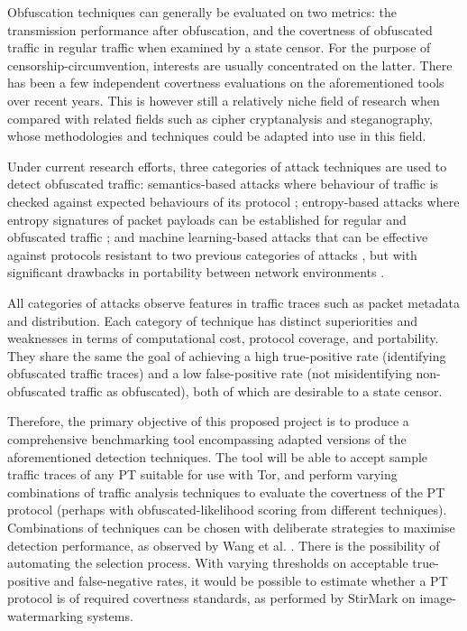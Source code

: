 \documentclass[11pt]{article}
\begin{document}
Obfuscation techniques can generally be evaluated on two metrics: the transmission performance after obfuscation, and the covertness of obfuscated traffic in regular traffic when examined by a state censor. For the purpose of censorship-circumvention, interests are usually concentrated on the latter. There has been a few independent covertness evaluations on the aforementioned tools \cite{tan2015towards} \cite{houmansadr2013parrot} \cite{wang2015seeing} over recent years. This is however still a relatively niche field of research when compared with related fields such as cipher cryptanalysis and steganography, whose methodologies and techniques could be adapted into use in this field.

Under current research efforts, three categories of attack techniques are used to detect obfuscated traffic: semantics-based attacks where behaviour of traffic is checked against expected behaviours of its protocol \cite[Sec. VIII]{houmansadr2013parrot} \cite[Sec. 4]{wang2015seeing}; entropy-based attacks where entropy signatures of packet payloads can be established for regular and obfuscated traffic \cite{tan2015towards} \cite[Sec. 5]{wang2015seeing}; and machine learning-based attacks that can be effective against protocols resistant to two previous categories of attacks \cite[Sec. 6]{wang2015seeing}, but with significant drawbacks in portability between network environments \cite{dixon2016network}. 

All categories of attacks observe features in traffic traces such as packet metadata and distribution. Each category of technique has distinct superiorities and weaknesses in terms of computational cost, protocol coverage, and portability. They share the same the goal of achieving a high true-positive rate (identifying obfuscated traffic traces) and a low false-positive rate (not misidentifying non-obfuscated traffic as obfuscated), both of which are desirable to a state censor. 

Therefore, the primary objective of this proposed project is to produce a comprehensive benchmarking tool encompassing adapted versions of the aforementioned detection techniques. The tool will be able to accept sample traffic traces of any PT suitable for use with Tor, and perform varying combinations of traffic analysis techniques to evaluate the covertness of the PT protocol (perhaps with obfuscated-likelihood scoring from different techniques). Combinations of techniques can be chosen with deliberate strategies to maximise detection performance, as observed by Wang et al. \cite[Sec. 5.2]{wang2015seeing}. There is the possibility of automating the selection process. With varying thresholds on acceptable true-positive and false-negative rates, it would be possible to estimate whether a PT protocol is of required covertness standards, as performed by StirMark \cite{petitcolas1998attacks} on image-watermarking systems.
\end{document}
